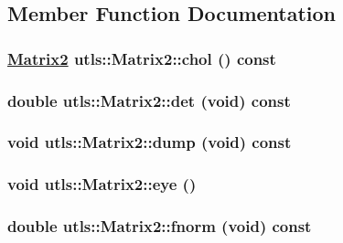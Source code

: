 \subsection{Member Function Documentation}
\hypertarget{classutls_1_1Matrix2_a652a2784d9ef2214e3f223229266af9}{
\subsubsection[chol]{\setlength{\rightskip}{0pt plus 5cm}\hyperlink{classutls_1_1Matrix2}{Matrix2} utls::Matrix2::chol () const}}
\label{classutls_1_1Matrix2_a652a2784d9ef2214e3f223229266af9}


\hypertarget{classutls_1_1Matrix2_f7e9b3385c13d04f3f31465c6082cbaa}{
\subsubsection[det]{\setlength{\rightskip}{0pt plus 5cm}double utls::Matrix2::det (void) const}}
\label{classutls_1_1Matrix2_f7e9b3385c13d04f3f31465c6082cbaa}


\hypertarget{classutls_1_1Matrix2_a69a2a530e756a36312fd2fa102bdcd3}{
\subsubsection[dump]{\setlength{\rightskip}{0pt plus 5cm}void utls::Matrix2::dump (void) const}}
\label{classutls_1_1Matrix2_a69a2a530e756a36312fd2fa102bdcd3}


\hypertarget{classutls_1_1Matrix2_4ac283348b1c6f5ab69285bf5ba4efd2}{
\subsubsection[eye]{\setlength{\rightskip}{0pt plus 5cm}void utls::Matrix2::eye ()}}
\label{classutls_1_1Matrix2_4ac283348b1c6f5ab69285bf5ba4efd2}


\hypertarget{classutls_1_1Matrix2_6c8be051c508d63c28dcdfc42eb70ae4}{
\subsubsection[fnorm]{\setlength{\rightskip}{0pt plus 5cm}double utls::Matrix2::fnorm (void) const}}
\label{classutls_1_1Matrix2_6c8be051c508d63c28dcdfc42eb70ae4}



